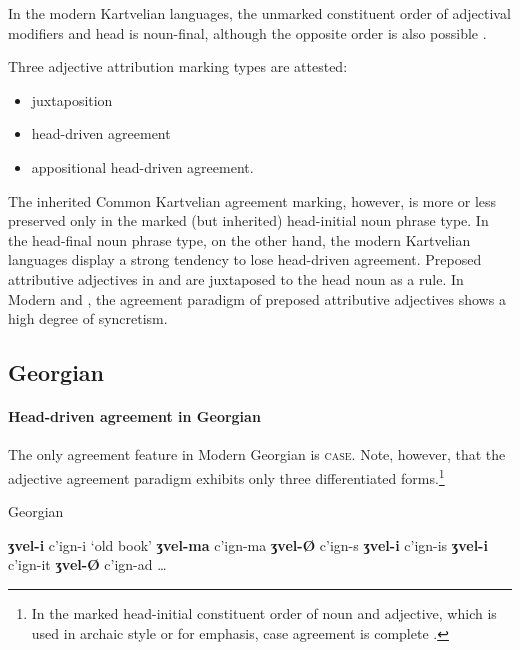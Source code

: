 In the modern Kartvelian languages, the unmarked constituent order of adjectival modifiers and head is noun-final, although the opposite order is also possible \citep[56]{harris1991a}.

Three adjective attribution marking types are attested:
\begin{itemize}
\item juxtaposition
\item head\hyp{}driven agreement
\item appositional head\hyp{}driven agreement.
\end{itemize}
The inherited Common Kartvelian agreement marking, however, is more or less preserved only in the marked (but inherited) head-initial noun phrase type. In the head-final noun phrase type, on the other hand, the modern Kartvelian languages display a strong tendency to lose head\hyp{}driven agreement. Preposed attributive adjectives in  and  are juxtaposed to the head noun as a rule. In Modern  and , the agreement paradigm of preposed attributive adjectives shows a high degree of syncretism.

\subsection{Georgian}
\label{georgian synchr}
\paragraph*{Head\hyp{}driven agreement in Georgian}
The only agreement feature in Modern Georgian is \textsc{case}. Note, however, that the adjective agreement paradigm exhibits only three differentiated forms.\footnote{In the marked head-initial constituent order of noun and adjective, which is used in archaic style or for emphasis, case agreement is complete \citep[59]{tuite1998}.}
\begin{exe}
\settowidth{}
\ex \rm{Georgian \citep[236]{aronson1991}}
\label{georgian old}
\begin{xlist}
\ex \textbf{ʒvel-i} c'ign-i		\rm{‘old book’}	
\ex \textbf{ʒvel-ma} c'ign-ma				
\ex \textbf{ʒvel-Ø} c'ign-s					
\ex \textbf{ʒvel-i} c'ign-is					
\ex \textbf{ʒvel-i} c'ign-it					
\ex \textbf{ʒvel-Ø} c'ign-ad					
\ex \dots
\end{xlist}
\end{exe}

